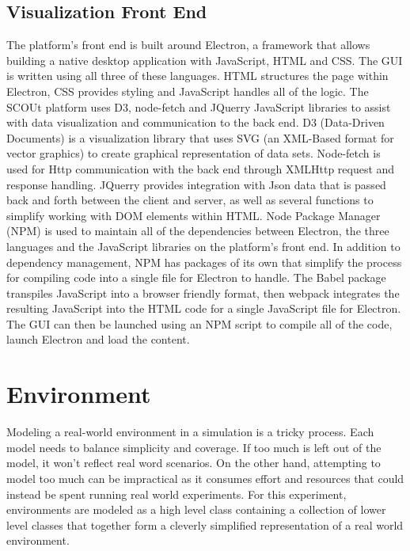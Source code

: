 \subsection{Visualization Front End}
The platform's front end is built around Electron,  a framework that allows building a native desktop application with JavaScript, HTML and CSS.
The GUI is written using all three of these languages.
HTML structures the page within Electron, CSS provides styling and JavaScript handles all of the logic.
The SCOUt platform uses D3, node-fetch and JQuerry JavaScript libraries to assist with data visualization and communication to the back end. 
D3 (Data-Driven Documents) is a visualization library that uses SVG (an XML-Based format for vector graphics) to create graphical representation of data sets.
Node-fetch is used for Http communication with the back end through XMLHttp request and response handling.
JQuerry provides integration with Json data that is passed back and forth between the client and server, as well as several functions to simplify working with DOM elements within HTML.
Node Package Manager (NPM)  is used to maintain all of the dependencies between Electron, the three languages and the JavaScript libraries on the platform's front end.
In addition to dependency management, NPM has packages of its own that simplify the process for compiling code into a single file for Electron to handle.
The Babel  package transpiles JavaScript into a browser friendly format, then webpack  integrates the resulting JavaScript into the HTML code for a single JavaScript file for Electron.
The GUI can then be launched using an NPM script to compile all of the code, launch Electron and load the content.



\section{Environment}
Modeling a real-world environment in a simulation is a tricky process.
Each model needs to balance simplicity and coverage.
If too much is left out of the model, it won’t reflect real word scenarios.
On the other hand, attempting to model too much can be impractical as it consumes effort and resources that could instead be spent running real world experiments.
For this experiment, environments are modeled as a high level class containing a collection of lower level classes that together form a cleverly simplified representation of a real world environment.

